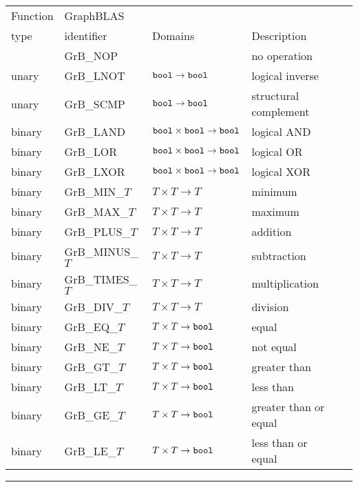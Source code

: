 \begin{table}
\begin{center}
\begin{tabular}{l|l|l|l|l}
Function & GraphBLAS             &                                                              & \\
type     & identifier            & Domains                                                      & Description \\ \hline
         & {\sf GrB\_NOP}        &                                                              & no operation \\
unary    & {\sf GrB\_LNOT}       & ${\tt bool} \rightarrow {\tt bool}$                          & logical inverse \\
unary    & {\sf GrB\_SCMP}       & ${\tt bool} \rightarrow {\tt bool}$                          & structural complement \\
binary   & {\sf GrB\_LAND}       & ${\tt bool} \times {\tt bool} \rightarrow {\tt bool}$	& logical AND \\
binary   & {\sf GrB\_LOR}        & ${\tt bool} \times {\tt bool} \rightarrow {\tt bool}$        & logical OR \\
binary   & {\sf GrB\_LXOR}       & ${\tt bool} \times {\tt bool} \rightarrow {\tt bool}$        & logical XOR \\
binary   & {\sf GrB\_MIN\_$T$}   & $T \times T \rightarrow T$                                  & minimum \\
binary   & {\sf GrB\_MAX\_$T$}   & $T \times T \rightarrow T$                                  & maximum \\
binary   & {\sf GrB\_PLUS\_$T$}	 & $T \times T \rightarrow T$    				& addition \\
binary   & {\sf GrB\_MINUS\_$T$} & $T \times T \rightarrow T$    				& subtraction \\
binary   & {\sf GrB\_TIMES\_$T$} & $T \times T \rightarrow T$    				& multiplication \\
binary   & {\sf GrB\_DIV\_$T$}   & $T \times T \rightarrow T$    				& division \\
binary   & {\sf GrB\_EQ\_$T$}    & $T \times T \rightarrow {\tt bool}$        			& equal \\
binary   & {\sf GrB\_NE\_$T$}    & $T \times T \rightarrow {\tt bool}$        			& not equal \\
binary   & {\sf GrB\_GT\_$T$}    & $T \times T \rightarrow {\tt bool}$        			& greater than  \\
binary   & {\sf GrB\_LT\_$T$}    & $T \times T \rightarrow {\tt bool}$        			& less than  \\
binary   & {\sf GrB\_GE\_$T$}    & $T \times T \rightarrow {\tt bool}$        			& greater than or equal \\
binary   & {\sf GrB\_LE\_$T$}    & $T \times T \rightarrow {\tt bool}$        			& less than or equal \\
\end{tabular}
\end{center}
\hrule
\end{table}

